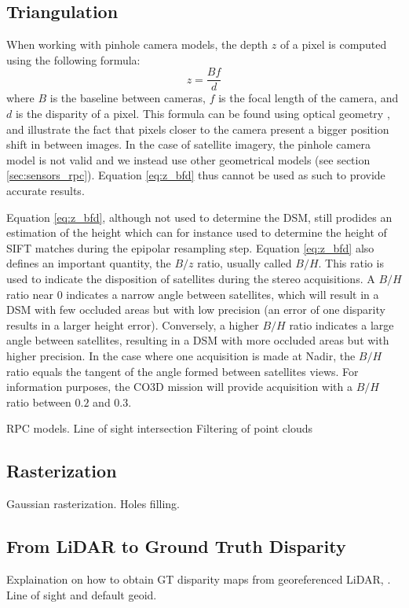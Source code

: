 \subsection{Triangulation}
When working with pinhole camera models, the depth $z$ of a pixel is computed using the following formula:
\begin{equation}
	z=\frac{Bf}{d}\label{eq:z_bfd}
\end{equation}
where $B$ is the baseline between cameras, $f$ is the focal length of the camera, and $d$ is the disparity of a pixel. This formula can be found using optical geometry \cite{bolles_epipolar-plane_1987}, and illustrate the fact that pixels closer to the camera present a bigger position shift in between images. In the case of satellite imagery, the pinhole camera model is not valid and we instead use other geometrical models (see section \ref{sec:sensors_rpc}). Equation \eqref{eq:z_bfd} thus cannot be used as such to provide accurate results.
\begin{remark}
	 Equation \eqref{eq:z_bfd}, although not used to determine the DSM, still prodides an estimation of the height which can for instance used to determine the height of SIFT matches during the epipolar resampling step. Equation \eqref{eq:z_bfd} also defines an important quantity, the $B/z$ ratio, usually called $B/H$. This ratio is used to indicate the disposition of satellites during the stereo acquisitions. A $B/H$ ratio near $0$ indicates a narrow angle between satellites, which will result in a DSM with few occluded areas but with low precision (an error of one disparity results in a larger height error). Conversely, a higher $B/H$ ratio indicates a large angle between satellites, resulting in a DSM with more occluded areas but with higher precision. In the case where one acquisition is made at Nadir, the $B/H$ ratio equals the tangent of the angle formed between satellites views. For information purposes, the CO3D mission will provide acquisition with a $B/H$ ratio between $0.2$ and $0.3$.
\end{remark}

RPC models. Line of sight intersection
Filtering of point clouds

\subsection{Rasterization}
Gaussian rasterization. Holes filling.  

\subsection{From LiDAR to Ground Truth Disparity}
Explaination on how to obtain GT disparity maps from georeferenced LiDAR, \cite{cournet_ground_2020}. Line of sight and default geoid. 


